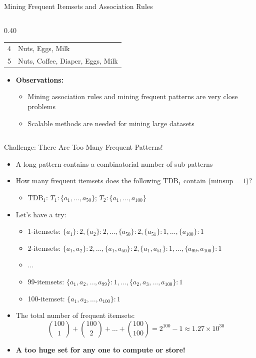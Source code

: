 \documentclass[aspectratio=169, 11pt]{beamer}
\begin{document}
\begin{frame}{Mining Frequent Itemsets and Association Rules}
\begin{columns}[T]
\begin{column}{0.40\textwidth}
\begin{tabular}{cl}
                4 & Nuts, Eggs, Milk \\
                5 & Nuts, Coffee, Diaper, Eggs, Milk \\
                \bottomrule
            \end{tabular}
            \vspace{2mm}
            \small
            \begin{itemize}
                \item \textbf{Observations:}
                \begin{itemize}
                    \item Mining association rules and mining frequent patterns are very close problems
                    \item Scalable methods are needed for mining large datasets
                \end{itemize}
            \end{itemize}
        \end{column}
    \end{columns}
\end{frame}

\begin{frame}{Challenge: There Are Too Many Frequent Patterns!}
    \small
    \begin{itemize}
        \item A long pattern contains a combinatorial number of sub-patterns
        \item How many frequent itemsets does the following $\text{TDB}_1$ contain ($\text{minsup} = 1$)?
        \begin{itemize}
            \item $\text{TDB}_1$: $T_1: \{a_1, \dots, a_{50}\}$; \quad $T_2: \{a_1, \dots, a_{100}\}$
        \end{itemize}
        \item Let's have a try:
        \begin{itemize}
            \item 1-itemsets: $\{a_1\}: 2, \{a_2\}: 2, \dots, \{a_{50}\}: 2, \{a_{51}\}: 1, \dots, \{a_{100}\}: 1$
            \item 2-itemsets: $\{a_1, a_2\}: 2, \dots, \{a_1, a_{50}\}: 2, \{a_1, a_{51}\}: 1, \dots, \{a_{99}, a_{100}\}: 1$
            \item $\dots$
            \item 99-itemsets: $\{a_1, a_2, \dots, a_{99}\}: 1, \dots, \{a_2, a_3, \dots, a_{100}\}: 1$
            \item 100-itemset: $\{a_1, a_2, \dots, a_{100}\}: 1$
        \end{itemize}
        \item The total number of frequent itemsets:
        $$\binom{100}{1} + \binom{100}{2} + \dots + \binom{100}{100} = 2^{100} - 1 \approx 1.27 \times 10^{30}$$
        \item \textbf{A too huge set for any one to compute or store!}
    \end{itemize}
\end{frame}
\end{document}
